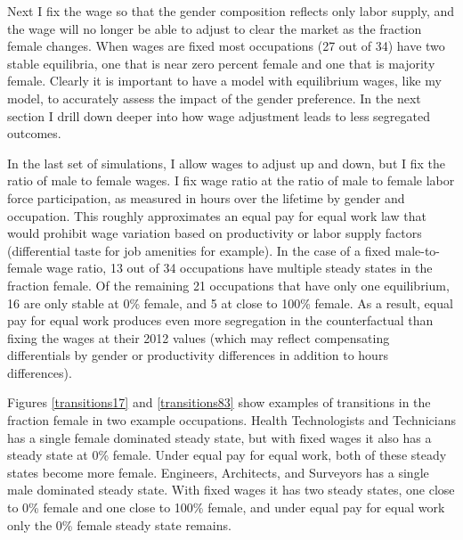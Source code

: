 \documentclass[12pt]{article}
\begin{document}
Next I fix the wage so that the gender composition reflects only labor supply, and the wage will no longer be able to adjust to clear the market as the fraction female changes. When wages are fixed most occupations (27 out of 34) have two stable equilibria, one that is near zero percent female and one that is majority female. Clearly it is important to have a model with equilibrium wages, like my model, to accurately assess the impact of the gender preference. In the next section I drill down deeper into how wage adjustment leads to less segregated outcomes.

In the last set of simulations, I allow wages to adjust up and down, but I fix the ratio of male to female wages. I fix wage ratio at the ratio of male to female labor force participation, as measured in hours over the lifetime by gender and occupation. This roughly approximates an equal pay for equal work law that would prohibit wage variation based on productivity or labor supply factors (differential taste for job amenities for example). In the case of a fixed male-to-female wage ratio, 13 out of 34 occupations have multiple steady states in the fraction female.  Of the remaining 21 occupations that have only one equilibrium, 16 are only stable at 0\% female, and 5 at close to 100\% female. As a result, equal pay for equal work produces even more segregation in the counterfactual than fixing the wages at their 2012 values (which may reflect compensating differentials by gender or productivity differences in addition to hours differences).


Figures \ref{transitions17} and \ref{transitions83} show examples of transitions in the fraction female in two example occupations. Health Technologists and Technicians has a single female dominated steady state, but with fixed wages it also has a steady state at 0\% female. Under equal pay for equal work, both of these steady states become more female. Engineers, Architects, and Surveyors has a single male dominated steady state. With fixed wages it has two steady states, one close to 0\% female and one close to 100\% female, and under equal pay for equal work only the 0\% female steady state remains.

\end{document}
